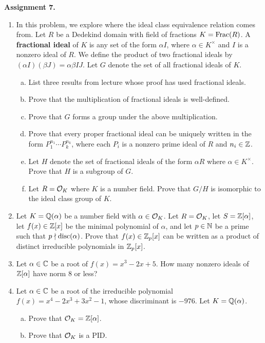 {\bf Assignment 7.} 
\begin{enumerate}[leftmargin=1.5cm, label={{\bf A7-\arabic*}}]
    \item \label{A7-1} In this problem, we explore where the ideal class 
    equivalence relation comes from. Let $R$ be a Dedekind domain with 
    field of fractions $K = \operatorname{Frac}(R)$. A {\bf fractional ideal} of 
    $K$ is any set of the form $\alpha I$, where $\alpha \in K^\times$ and 
    $I$ is a nonzero ideal of $R$. We define the product of two fractional 
    ideals by $(\alpha I)(\beta J) = \alpha\beta IJ$. Let $G$ denote 
    the set of all fractional ideals of $K$. 
    \begin{enumerate}[(a)]
        \item List three results from lecture whose proof has used 
        fractional ideals. 
        \item Prove that the multiplication of fractional ideals is well-defined. 
        \item Prove that $G$ forms a group under the above multiplication.
        \item Prove that every proper fractional ideal can be uniquely written 
        in the form $P_1^{n_1} \cdots P_k^{n_k}$, where each $P_i$ is a nonzero 
        prime ideal of $R$ and $n_i \in \mathbb{Z}$. 
        \item Let $H$ denote the set of fractional ideals of the form 
        $\alpha R$ where $\alpha \in K^\times$. Prove that $H$ is a subgroup of $G$. 
        \item Let $R = {\cal O}_K$ where $K$ is a number field. Prove that 
        $G/H$ is isomorphic to the ideal class group of $K$.
    \end{enumerate}
    \item \label{A7-2} Let $K = \mathbb{Q}(\alpha)$ be a number field with $\alpha \in {\cal O}_K$. 
    Let $R = {\cal O}_K$, let $S = \mathbb{Z}[\alpha]$, let $f(x) \in \mathbb{Z}[x]$ be the minimal 
    polynomial of $\alpha$, and let $p \in \mathbb{N}$ be a prime such that 
    $p \nmid \operatorname{disc}(\alpha)$. Prove that $f(x) \in \mathbb{Z}_p[x]$ can be written 
    as a product of distinct irreducible polynomials in $\mathbb{Z}_p[x]$.
    \item \label{A7-3} Let $\alpha \in \mathbb{C}$ be a root of $f(x) = x^3 - 2x + 5$. 
    How many nonzero ideals of $\mathbb{Z}[\alpha]$ have norm $8$ or less?
    \item \label{A7-4} Let $\alpha \in \mathbb{C}$ be a root of the irreducible 
    polynomial $f(x) = x^4 - 2x^3 + 3x^2 - 1$, whose discriminant is $-976$. 
    Let $K = \mathbb{Q}(\alpha)$. 
    \begin{enumerate}[(a)]
        \item Prove that ${\cal O}_K = \mathbb{Z}[\alpha]$. 
        \item Prove that ${\cal O}_K$ is a PID. 
    \end{enumerate}
\end{enumerate}